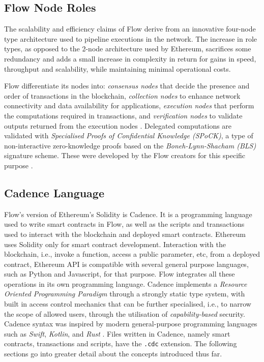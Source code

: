 \documentclass[../NFTComp_IEEE.tex]{subfiles}
\begin{document}
\subsection{Flow Node Roles}
The scalability and efficiency claims of Flow derive from an innovative four-node type architecture used to pipeline executions in the network. The increase in role types, as opposed to the 2-node architecture used by Ethereum, sacrifices some redundancy and adds a small increase in complexity in return for gains in speed, throughput and scalability, while maintaining minimal operational costs.
\par
Flow differentiate its nodes into: \textit{consensus nodes} that decide the presence and order of transactions in the blockchain, \textit{collection nodes} to enhance network connectivity and data availability for applications, \textit{execution nodes} that perform the computations required in transactions, and \textit{verification nodes} to validate outputs returned from the execution nodes \cite{Hentschel2019b}. Delegated computations are validated with \textit{Specialised Proofs of Confidential Knowledge (SPoCK)}, a type of non-interactive zero-knowledge proofs based on the \textit{Boneh-Lynn-Shacham (BLS)} signature scheme. These were developed by the Flow creators for this specific purpose \cite{Ben2020}.

\subsection{Cadence Language}
\label{sec:cadence_language}
Flow's version of Ethereum's Solidity is Cadence. It is a programming language used to write smart contracts in Flow, as well as the scripts and transactions used to interact with the blockchain and deployed smart contracts. Ethereum uses Solidity only for smart contract development. Interaction with the blockchain, i.e., invoke a function, access a public parameter, etc, from a deployed contract, Ethereum API is compatible with several general purpose languages, such as Python and Javascript, for that purpose. Flow integrates all these operations in its own programming language. Cadence implements a \textit{Resource Oriented Programming Paradigm} through a strongly static type system, with built in access control mechanics that can be further specialised, i.e., to narrow the scope of allowed users, through the utilisation of \textit{capability-based} security. Cadence syntax was inspired by modern general-purpose programming languages such as \textit{Swift}, \textit{Kotlin}, and \textit{Rust} \cite{flow2020a} \cite{Cadence2023}. Files written in Cadence, namely smart contracts, transactions and scripts, have the \verb|.cdc| extension. The following sections go into greater detail about the concepts introduced thus far.
\end{document}
